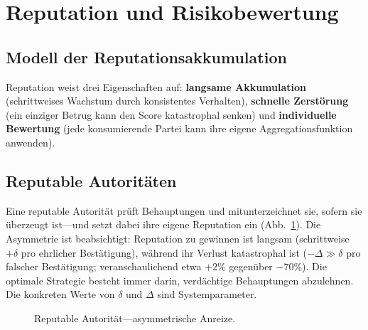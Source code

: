 \documentclass[11pt,a4paper,twocolumn]{article}
\begin{document}
\section{Reputation und Risikobewertung}

\subsection{Modell der Reputationsakkumulation}

Reputation weist drei Eigenschaften auf: \textbf{langsame Akkumulation} (schrittweises Wachstum durch konsistentes Verhalten), \textbf{schnelle Zerstörung} (ein einziger Betrug kann den Score katastrophal senken) und \textbf{individuelle Bewertung} (jede konsumierende Partei kann ihre eigene Aggregationsfunktion anwenden).

\subsection{Reputable Autoritäten}

Eine reputable Autorität prüft Behauptungen und mitunterzeichnet sie, sofern sie überzeugt ist---und setzt dabei ihre eigene Reputation ein (Abb.~\ref{fig:authority}). Die Asymmetrie ist beabsichtigt: Reputation zu gewinnen ist langsam (schrittweise $+\delta$ pro ehrlicher Bestätigung), während ihr Verlust katastrophal ist ($-\Delta \gg \delta$ pro falscher Bestätigung; veranschaulichend etwa $+2\%$ gegenüber $-70\%$). Die optimale Strategie besteht immer darin, verdächtige Behauptungen abzulehnen. Die konkreten Werte von $\delta$ und $\Delta$ sind Systemparameter.

\begin{figure}[ht]
\centering
{}
\caption{Reputable Autorität---asymmetrische Anreize.}
\label{fig:authority}
\end{figure}
\end{document}
